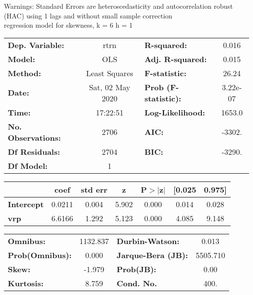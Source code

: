 Warnings: \newline
 [1] Standard Errors are heteroscedasticity and autocorrelation robust (HAC) using 1 lags and without small sample correction\\ 

regression model for skewness, k = 6 h = 1\begin{center}
\begin{tabular}{lclc}
\toprule
\textbf{Dep. Variable:}    &       rtrn       & \textbf{  R-squared:         } &     0.016   \\
\textbf{Model:}            &       OLS        & \textbf{  Adj. R-squared:    } &     0.015   \\
\textbf{Method:}           &  Least Squares   & \textbf{  F-statistic:       } &     26.24   \\
\textbf{Date:}             & Sat, 02 May 2020 & \textbf{  Prob (F-statistic):} &  3.22e-07   \\
\textbf{Time:}             &     17:22:51     & \textbf{  Log-Likelihood:    } &    1653.0   \\
\textbf{No. Observations:} &        2706      & \textbf{  AIC:               } &    -3302.   \\
\textbf{Df Residuals:}     &        2704      & \textbf{  BIC:               } &    -3290.   \\
\textbf{Df Model:}         &           1      & \textbf{                     } &             \\
\bottomrule
\end{tabular}
\begin{tabular}{lcccccc}
                   & \textbf{coef} & \textbf{std err} & \textbf{z} & \textbf{P$> |$z$|$} & \textbf{[0.025} & \textbf{0.975]}  \\
\midrule
\textbf{Intercept} &       0.0211  &        0.004     &     5.902  &         0.000        &        0.014    &        0.028     \\
\textbf{vrp}       &       6.6166  &        1.292     &     5.123  &         0.000        &        4.085    &        9.148     \\
\bottomrule
\end{tabular}
\begin{tabular}{lclc}
\textbf{Omnibus:}       & 1132.837 & \textbf{  Durbin-Watson:     } &    0.013  \\
\textbf{Prob(Omnibus):} &   0.000  & \textbf{  Jarque-Bera (JB):  } & 5505.710  \\
\textbf{Skew:}          &  -1.979  & \textbf{  Prob(JB):          } &     0.00  \\
\textbf{Kurtosis:}      &   8.759  & \textbf{  Cond. No.          } &     400.  \\
\bottomrule
\end{tabular}
\end{center}

